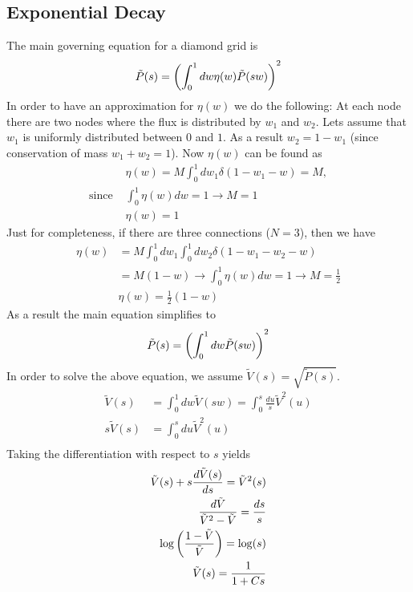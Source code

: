 \subsection*{Exponential Decay}
%
The main governing equation for a diamond grid is 
%
\begin{align}
  \tilde P(s) = \left(  \int_0^1 d w \eta(w) \tilde P(s w)  \right)^{2} 
\end{align}
%
In order to have an approximation for $\eta(w)$ we do the following:
At each node there are two nodes where the flux is distributed by
$w_1$ and $w_2$. Lets assume that $w_1$ is uniformly distributed
between $0$ and $1$. As a result $w_2 = 1-w_1$ (since conservation of
mass $w_1 + w_2 = 1$). Now $\eta(w)$ can be found as
%
\begin{align}
  & \eta(w) = M \int_0^1 dw_1 \delta(1-w_1-w) =  M, \\
  \text{since }& \int_0^1 \eta(w) dw = 1 \to M =1 \\
  & \eta (w) = 1
\end{align}
%
Just for completeness, if there are three connections ($N=3$), then we
have
%
\begin{align}
  \eta(w) & = M \int_0^1 dw_1 \int_0^1 dw_2 \delta(1-w_1-w_2 - w)\\
          & = M(1-w)  \to \int_0^1\eta(w) dw = 1 \to M = \frac{1}{2} \\
  & \eta(w) = \frac{1}{2} (1-w)
\end{align}
%
As a result the main equation simplifies to
%
\begin{align}
  \tilde P(s) = \left(  \int_0^1 d w  \tilde P(s w)  \right)^{2} 
\end{align}
%
In order to solve the above equation, we assume $\tilde V (s) =
\sqrt{\tilde{P}(s)}$.
%
\begin{align}
  \tilde{V}(s) & = \int_0^1 dw \tilde V (sw) = \int_0^s \frac{du}{s}  \tilde{V}^{2}(u) \\
  s\tilde{V}(s) & = \int_0^s du  \tilde{V}^2(u) \\
\end{align}
%
Taking the differentiation with respect to $s$ yields
%
\begin{align}
  \tilde{V}(s) + s \frac{d \tilde{V}(s)}{d s} = \tilde{V}^2(s) \\
  \frac{d \tilde{V}}{\tilde{V}^2-\tilde{V}} = \frac{ds}{s}  \\
  \log\left( \frac{1-\tilde{V}}{\tilde{V}} \right)  = \log(s)\\
  \tilde{V}(s) = \frac{1}{1+Cs} 
\end{align}
